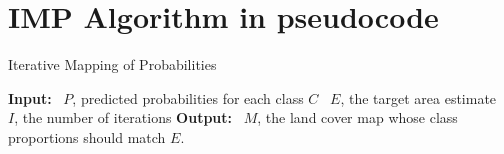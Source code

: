 \section{IMP Algorithm in pseudocode}
\label{alg:imp}
    \newcommand{\lbox}[2]{\parbox[t]{\dimexpr 0.9\linewidth-#1em}{#2 \strut}}

    \begin{algorithm}[H]
    \caption{Iterative Mapping of Probabilities}
    
    \begin{algorithmic}[1]
    \Statex \textbf{Input:} 
    \Statex \textbullet~$P$, predicted probabilities for each class $C$
    \Statex \textbullet~$E$, the target area estimate 
    \Statex \textbullet~$I$, the number of iterations
    \Statex \textbf{Output:}
    \Statex \textbullet~$M$, the land cover map whose class proportions should match $E$.
    

\end{algorithmic}
\end{algorithm}
